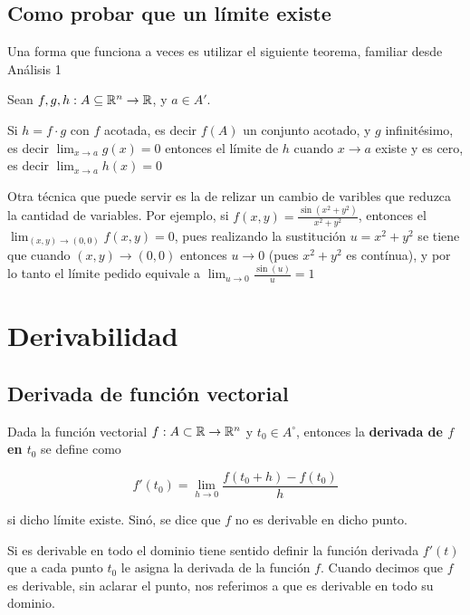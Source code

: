 \section{Como probar que un límite existe}

Una forma que funciona a veces es utilizar el siguiente teorema, familiar desde Análisis 1

\begin{proposition}
Sean $f,g,h:A \subseteq \mathbb{R}^n \to \mathbb{R}$, y $a \in A'$.

Si $h = f \cdot g$ con $f$ acotada, es decir $f(A)$ un conjunto acotado, y $g$ infinitésimo, es decir $ \lim_{x \to a} g(x) = 0$ entonces el límite de $h$ cuando $x \to a$ existe y es cero, es decir $ \lim_{x \to a} h(x) = 0$
\end{proposition}

Otra técnica que puede servir es la de relizar un cambio de varibles que reduzca la cantidad de variables.  Por ejemplo, si $f(x,y) = \frac{\sin(x^2 + y^2)}{x^2 + y^2}$, entonces el $ \lim_{(x,y) \to (0,0) } f(x,y) = 0$, pues realizando la sustitución $ u = x^2 + y^2$ se tiene que cuando $(x,y) \to (0,0)$ entonces $u \to 0$ (pues $x^2 + y^2$ es contínua), y por lo tanto el límite pedido equivale a $ \lim_{u \to 0} \frac{\sin(u)}{u} = 1$


\chapter{Derivabilidad}

\section{Derivada de función vectorial}

\begin{definition}[Derivada]
Dada la función vectorial $ f: A \subset \mathbb{R} \to \mathbb{R}^n$ y $ t_0 \in A^{\circ}$, entonces la \textbf{derivada de $f$ en $t_0$}  se define como

$$ \displaystyle f'(t_0) = \lim_{h \to 0} \frac{f(t_0 + h) - f(t_0)}{h} $$

si dicho límite existe.  Sinó, se dice que $f$ no es derivable en dicho punto.
\end{definition}

Si es derivable en todo el dominio tiene sentido definir la función derivada $ f'(t)$ que a cada punto $t_0$ le asigna la derivada de la función $f$.  Cuando decimos que $f$ es derivable, sin aclarar el punto, nos referimos a que es derivable en todo su dominio.


